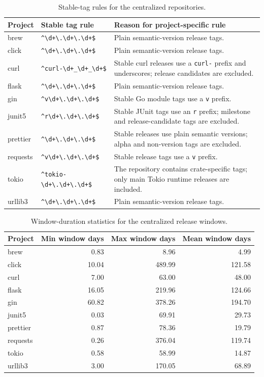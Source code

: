 \begin{table}[H]
\centering
\scriptsize
\renewcommand{\arraystretch}{1.12}
\begin{tabularx}{\textwidth}{p{1.8cm}p{3.5cm}X}
\toprule
\textbf{Project} & \textbf{Stable tag rule} & \textbf{Reason for project-specific rule} \\
\midrule
brew & \verb|^\d+\.\d+\.\d+$| & Plain semantic-version release tags. \\
click & \verb|^\d+\.\d+\.\d+$| & Plain semantic-version release tags. \\
curl & \verb|^curl-\d+_\d+_\d+$| & Stable curl releases use a \texttt{curl-} prefix and underscores; release candidates are excluded. \\
flask & \verb|^\d+\.\d+\.\d+$| & Plain semantic-version release tags. \\
gin & \verb|^v\d+\.\d+\.\d+$| & Stable Go module tags use a \texttt{v} prefix. \\
junit5 & \verb|^r\d+\.\d+\.\d+$| & Stable JUnit tags use an \texttt{r} prefix; milestone and release-candidate tags are excluded. \\
prettier & \verb|^\d+\.\d+\.\d+$| & Stable releases use plain semantic versions; alpha and non-version tags are excluded. \\
requests & \verb|^v\d+\.\d+\.\d+$| & Stable release tags use a \texttt{v} prefix. \\
tokio & \verb|^tokio-\d+\.\d+\.\d+$| & The repository contains crate-specific tags; only main Tokio runtime releases are included. \\
urllib3 & \verb|^\d+\.\d+\.\d+$| & Plain semantic-version release tags. \\
\bottomrule
\end{tabularx}
\caption{Stable-tag rules for the centralized repositories.}
\label{tab:centralized_tag_rules}
\end{table}

\begin{table}[H]
\centering
\scriptsize
\renewcommand{\arraystretch}{1.12}
\begin{tabular}{lrrr}
\toprule
\textbf{Project} & \textbf{Min window days} & \textbf{Max window days} & \textbf{Mean window days} \\
\midrule
brew     & 0.83 & 8.96   & 4.99 \\
click    & 10.04 & 489.99 & 121.58 \\
curl     & 7.00 & 63.00  & 48.00 \\
flask    & 16.05 & 219.96 & 124.66 \\
gin      & 60.82 & 378.26 & 194.70 \\
junit5   & 0.03 & 69.91  & 29.73 \\
prettier & 0.87 & 78.36  & 19.79 \\
requests & 0.26 & 376.04 & 119.74 \\
tokio    & 0.58 & 58.99  & 14.87 \\
urllib3  & 3.00 & 170.05 & 68.89 \\
\bottomrule
\end{tabular}
\caption[Window-duration statistics.]{Window-duration statistics for the centralized release windows.}
\label{tab:round1_window_durations}
\end{table}

